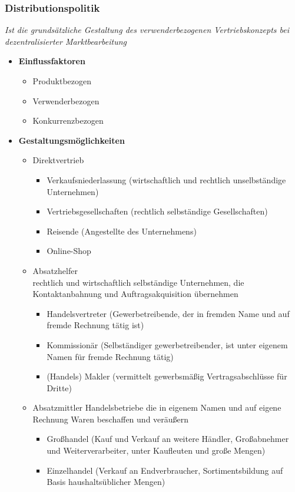 \documentclass[a4paper,11pt, twoside]{article}
\begin{document}
\subsubsection*{Distributionspolitik}
\textit{Ist die grundsätzliche Gestaltung des verwenderbezogenen Vertriebskonzepts bei dezentralisierter Marktbearbeitung}
\begin{itemize}
	\item \textbf{Einflussfaktoren}
\begin{itemize}
	\item Produktbezogen
	\item Verwenderbezogen
	\item Konkurrenzbezogen
\end{itemize}

	\item \textbf{Gestaltungsmöglichkeiten}
\begin{itemize}

	\item Direktvertrieb
\begin{itemize}
	\item Verkaufsniederlassung (wirtschaftlich und rechtlich unselbständige Unternehmen)
	\item Vertriebsgesellschaften (rechtlich selbständige Gesellschaften)
	\item Reisende (Angestellte des Unternehmens)
	\item Online-Shop
\end{itemize}

	\item Absatzhelfer\\
rechtlich und wirtschaftlich selbständige Unternehmen, die Kontaktanbahnung und Auftragsakquisition übernehmen
\begin{itemize}
	\item Handelsvertreter (Gewerbetreibende, der in fremden Name und auf fremde Rechnung tätig ist)
	\item Kommissionär (Selbständiger gewerbetreibender, ist unter eigenem Namen für fremde Rechnung tätig)
	\item (Handels) Makler (vermittelt gewerbsmäßig Vertragsabschlüsse für Dritte)
\end{itemize}

	\item Absatzmittler
Handelsbetriebe die in eigenem Namen und auf eigene Rechnung Waren beschaffen und veräußern
\begin{itemize}
	\item Großhandel (Kauf und Verkauf an weitere Händler, Großabnehmer und Weiterverarbeiter, unter Kaufleuten und große Mengen)
	\item Einzelhandel (Verkauf an Endverbraucher, Sortimentsbildung auf Basis haushaltsüblicher Mengen)
\end{itemize}
\end{itemize}


\end{itemize}
\end{document}
